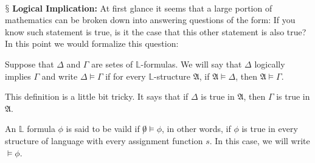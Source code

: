 \documentclass[9pt,a4paper, twocolumn]{article}
\newcommand{\newpoint}[1]{\ \\ \indent$\mathsection$ \textbf{#1}}
\newcommand{\curveL}{\mathbb{L} }
\newcommand{\curveA}{\mathfrak{A} }
\begin{document}
        \newpoint{Logical Implication: } 
                At first glance it seems that a large portion of mathematics can be broken down into answering questions of the form: If you know such statement is true, is it the case that this other statement is also true? In this point we would formalize this question:
                \begin{define}
                    Suppose that $\Delta$ and $\Gamma$ are setes of $\curveL$-formulas. We will say that $\Delta$ logically implies $\Gamma$ and write $\Delta\vDash\Gamma$ if for every $\curveL$-structure $\curveA$, if $\curveA\vDash\Delta$, then $\curveA\vDash\Gamma$.
                \end{define}
                This definition is a little bit tricky. It says that if $\Delta$ is true in $\curveA$, then $\Gamma$ is true in $\curveA$. 
                \begin{define}
                    An $\curveL$ formula $\phi$ is said to be vaild if $\not0\vDash\phi$, in other words, if $\phi$ is true in every structure of language with every assignment function $s$. In this case, we will write $\vDash \phi$.
                \end{define}
\end{document}

